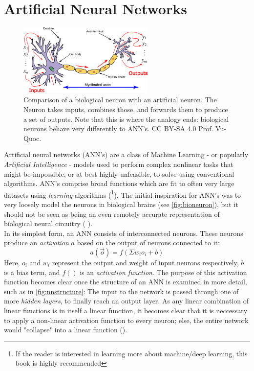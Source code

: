 \section{Artificial Neural Networks}
\label{sec:ANN}
\begin{figure}[htbp]
    \centering
    \includegraphics[width=0.6\textwidth]{images/neuron.png}
    \caption{Comparison of a biological neuron with an artificial neuron. The Neuron takes inputs, combines those, and forwards them to produce a set of outputs. Note that this is where the analogy ends: biological neurons behave very differently to ANN's. CC BY-SA 4.0 Prof. Vu-Quoc.}
    \label{fig:bioneuron}
\end{figure}
Artificial neural networks (ANN's) are a class of Machine Learning - or popularly \textit{Artificial Intelligence} - models used to perform complex nonlinear tasks that might be impossible, or at best highly unfeasible, to solve using conventional algorithms. ANN's comprise broad functions which are fit to often very large datasets using \textit{learning} algorithms (\cite{nnbooktwo}\footnote{If the reader is interested in learning more about machine/deep learning, this book is highly recommended}). The initial inspiration for ANN's was to very loosely model the neurons in biological brains (see \autoref{fig:bioneuron}), but it should not be seen as being an even remotely accurate representation of biological neural circuitry ( \cite{nnbookone}). \\

In its simplest form, an ANN consists of interconnected neurons. These neurons produce an \textit{activation} $a$ based on the output of neurons connected to it:
\begin{equation}
    a(\vec{o}) = f \left( \Sigma w_io_i + b\right) 
    \label{eq:neuron}
\end{equation}
Here, $o_i$ and $w_i$ represent the output and weight of input neurons respectively, $b$ is a bias term, and $f()$ is an \textit{activation function}. The purpose of this activation function becomes clear once the structure of an ANN is examined in more detail, such as in \autoref{fig:nnstructure}: The input to the network is passed through one of more \textit{hidden layers}, to finally reach an output layer. As any linear combination of linear functions is in itself a linear function, it becomes clear that it is neccessary to apply a non-linear activation function to every neuron; else, the entire network would "collapse" into a linear function (\cite{nnbooktwo}).\\

